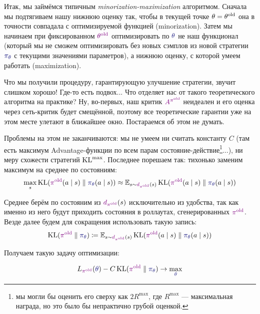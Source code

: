 Итак, мы займёмся типичным \emph{minorization-maximization} алгоритмом. Сначала мы подтягиваем нашу нижнюю оценку так, чтобы в текущей точке $\theta \HM= \theta^{\old}$ она в точности совпадала с оптимизируемой функцией (minorization). Затем мы начинаем при фиксированном $\textcolor{ChadPurple}{\theta^{\old}}$ оптимизировать по $\textcolor{ChadBlue}{\theta}$ не наш функционал (который мы не сможем оптимизировать без новых сэмплов из новой стратегии $\textcolor{ChadBlue}{\pi_\theta}$ с текущими значениями параметров), а нижнюю оценку, с которой умеем работать (maximization). 

Что мы получили процедуру, гарантирующую улучшение стратегии, звучит слишком хорошо! Где-то есть подвох... Что отделяет нас от такого теоретического алгоритма на практике? Ну, во-первых, наш критик $\textcolor{ChadPurple}{A^{\pi^{\old}}}$ неидеален и его оценка через сеть-критик будет смещённой, поэтому все теоретические гарантии уже на этом месте улетают в ближайшее окно. Постараемся об этом не думать.

Проблемы на этом не заканчиваются: мы не умеем ни считать константу $C$ (там есть максимум Advantage-функции по всем парам состояние-действие\footnote{мы могли бы оценить его сверху как $2R^{\max}$, где $R^{\max}$ --- максимальная награда, но это было бы непрактично грубой оценкой.}...), ни меру схожести стратегий $\operatorname{KL}^{\max}$. Последнее порешаем так: тихонько заменим максимум на среднее по состояниям:
$$\max_s \KL(\textcolor{ChadPurple}{\pi^{\old}}(a \mid s) \parallel \textcolor{ChadBlue}{\pi_\theta}(a \mid s)) \approx \E_{s \sim \textcolor{ChadPurple}{d_{\pi^{\old}}}(s)} \KL(\textcolor{ChadPurple}{\pi^{\old}}(a \mid s) \parallel \textcolor{ChadBlue}{\pi_\theta}(a \mid s))$$

Среднее берём по состояним из $\textcolor{ChadPurple}{d_{\pi^{\old}}}(s)$ исключительно из удобства, так как именно из него будут приходить состояния в роллаутах, сгенерированных $\textcolor{ChadPurple}{\pi^{\old}}$. Везде далее будем для сокращения использовать такую запись:
$$\KL(\textcolor{ChadPurple}{\pi^{\old}} \parallel \textcolor{ChadBlue}{\pi_\theta}) \coloneqq \E_{s \sim \textcolor{ChadPurple}{d_{\pi^{\old}}}(s)} \KL(\textcolor{ChadPurple}{\pi^{\old}}(a \mid s) \parallel \textcolor{ChadBlue}{\pi_\theta}(a \mid s))$$ 

Получаем такую задачу оптимизации:

\begin{equation}\label{lowerboundmean}
L_{\textcolor{ChadPurple}{\pi^{\old}}}(\textcolor{ChadBlue}{\theta}) - C \KL(\textcolor{ChadPurple}{\pi^{\old}} \parallel \textcolor{ChadBlue}{\pi_\theta}) \to \max_{\textcolor{ChadBlue}{\theta}}
\end{equation}

